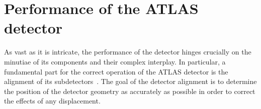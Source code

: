 	

\fi





\section{Performance of the ATLAS detector}
\label{sec:Chap2:ID_alignement}
As vast as it is intricate, the performance of the detector  hinges crucially on the minutiae of its components and their complex interplay. 
In particular, a fundamental part for the correct operation of the ATLAS detector is the alignment of its subdetectors~\cite{ATLAS:2020ixw}. The goal of
the detector alignment is to determine the position of the detector geometry as accurately as possible in order to
correct the effects of any displacement. %

